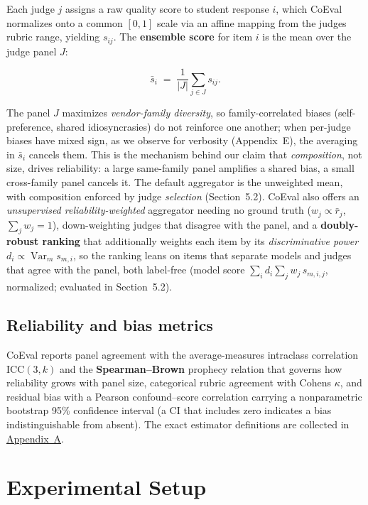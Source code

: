Each judge \(j\) assigns a raw quality score to student response \(i\), which CoEval normalizes onto a common
\([0,1]\) scale via an affine mapping from the judge\textquotesingle s rubric range, yielding \(s_{ij}\). The \textbf{ensemble score}
for item \(i\) is the mean over the judge panel \(J\):

\[\bar{s}_i \;=\; \frac{1}{|J|} \sum_{j \in J} s_{ij}.\]

The panel \(J\) maximizes \emph{vendor-family diversity}, so family-correlated biases (self-preference, shared
idiosyncrasies) do not reinforce one another; when per-judge biases have mixed sign, as we observe for verbosity
(Appendix~E), the averaging in \(\bar{s}_i\) cancels them. This is the mechanism behind our claim that
\emph{composition}, not size, drives reliability: a large same-family panel amplifies a shared bias, a small
cross-family panel cancels it. The default aggregator is the unweighted mean, with composition enforced by judge
\emph{selection} (Section~5.2). CoEval also offers an \emph{unsupervised reliability-weighted} aggregator
needing no ground truth (\(w_j \propto \bar{r}_j\), \(\sum_j w_j = 1\)), down-weighting judges that disagree with the
panel, and a \textbf{doubly-robust ranking} that additionally weights each item by its
\emph{discriminative power} \(d_i \propto \operatorname{Var}_m s_{m,i}\), so the ranking leans on items that separate
models and judges that agree with the panel, both label-free (model score \(\sum_i d_i \sum_{j} w_j\, s_{m,i,j}\),
normalized; evaluated in Section~5.2).

\subsection{Reliability and bias metrics}\label{reliability-and-bias-metrics}

CoEval reports panel agreement with the average-measures intraclass correlation \(\mathrm{ICC}(3,k)\) and the
\textbf{Spearman--Brown} prophecy relation that governs how reliability grows with panel size,
categorical rubric agreement with Cohen\textquotesingle s \(\kappa\), and residual bias with a Pearson confound--score correlation
carrying a nonparametric bootstrap 95\% confidence interval (a CI that includes zero indicates a bias indistinguishable
from absent). The exact estimator definitions are collected in \hyperref[appA]{Appendix~A}.

\section{Experimental Setup}\label{experimental-setup}

